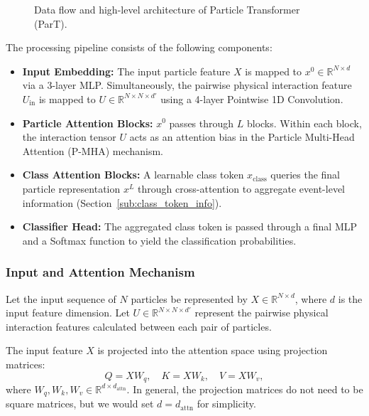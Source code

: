 \documentclass[12pt]{article}
\begin{document}
\begin{figure}[htbp]
\begin{tikzpicture}
                \end{tikzpicture}
                \caption{Data flow and high-level architecture of Particle Transformer (ParT).}
                \label{fig:part_architecture_flow}
            \end{figure}

            The processing pipeline consists of the following components:
            \begin{itemize}
                \item \textbf{Input Embedding:} The input particle feature $X$ is mapped to $x^0 \in \mathbb{R}^{N \times d}$ via a 3-layer MLP. Simultaneously, the pairwise physical interaction feature $U_{\text{in}}$ is mapped to $U \in \mathbb{R}^{N \times N \times d'}$ using a 4-layer Pointwise 1D Convolution.
                \item \textbf{Particle Attention Blocks:} $x^0$ passes through $L$ blocks. Within each block, the interaction tensor $U$ acts as an attention bias in the Particle Multi-Head Attention (P-MHA) mechanism.
                \item \textbf{Class Attention Blocks:} A learnable class token $x_{\text{class}}$ queries the final particle representation $x^L$ through cross-attention to aggregate event-level information (Section~\ref{sub:class_token_info}).
                \item \textbf{Classifier Head:} The aggregated class token is passed through a final MLP and a Softmax function to yield the classification probabilities.
            \end{itemize}

        \subsubsection{Input and Attention Mechanism}
        
            Let the input sequence of $N$ particles be represented by $X \in \mathbb{R}^{N \times d}$, where $d$ is the input feature dimension. Let $U \in \mathbb{R}^{N \times N \times d'}$ represent the pairwise physical interaction features calculated between each pair of particles.
            
            The input feature $X$ is projected into the attention space using projection matrices:
            \begin{equation} \label{eq:projection_qkv}
                Q = X W_q, \quad K = X W_k, \quad V = X W_v,
            \end{equation}
            where $W_q, W_k, W_v \in \mathbb{R}^{d \times d_{\text{attn}}}$. In general, the projection matrices do not need to be square matrices, but we would set $d = d_{\text{attn}}$ for simplicity. 
            
\end{document}
